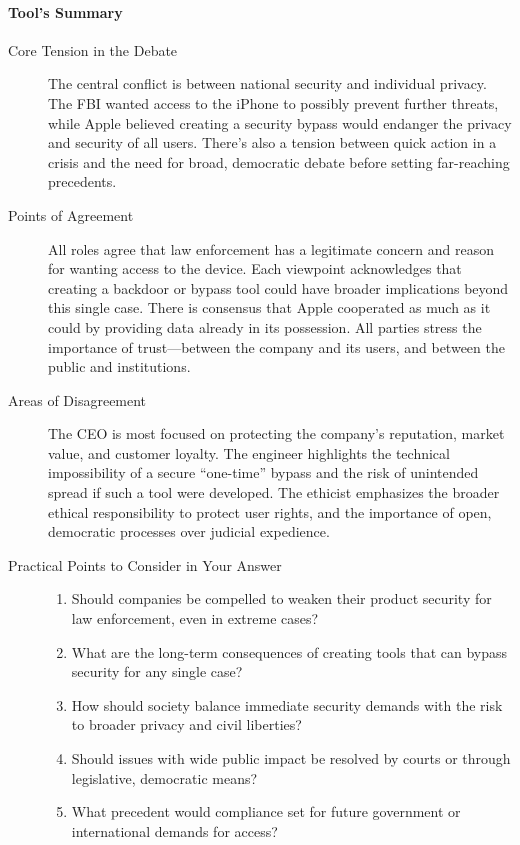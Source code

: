 \paragraph{Tool's Summary}{
  \begin{description}
    \item[Core Tension in the Debate] The central conflict is between national security and individual privacy. The FBI wanted access to the iPhone to possibly prevent further threats, while Apple believed creating a security bypass would endanger the privacy and security of all users. There's also a tension between quick action in a crisis and the need for broad, democratic debate before setting far-reaching precedents.
    \item[Points of Agreement] All roles agree that law enforcement has a legitimate concern and reason for wanting access to the device.
      Each viewpoint acknowledges that creating a backdoor or bypass tool could have broader implications beyond this single case.
      There is consensus that Apple cooperated as much as it could by providing data already in its possession.
      All parties stress the importance of trust—between the company and its users, and between the public and institutions.
    \item[Areas of Disagreement] The CEO is most focused on protecting the company's reputation, market value, and customer loyalty.
      The engineer highlights the technical impossibility of a secure “one-time” bypass and the risk of unintended spread if such a tool were developed.
      The ethicist emphasizes the broader ethical responsibility to protect user rights, and the importance of open, democratic processes over judicial expedience.
    \item[Practical Points to Consider in Your Answer]{
        \hfill
        \begin{enumerate}[label=(\alph*)]
          \item Should companies be compelled to weaken their product security for law enforcement, even in extreme cases?
          \item What are the long-term consequences of creating tools that can bypass security for any single case?
          \item How should society balance immediate security demands with the risk to broader privacy and civil liberties?
          \item Should issues with wide public impact be resolved by courts or through legislative, democratic means?
          \item What precedent would compliance set for future government or international demands for access?
        \end{enumerate}
      }
  \end{description}
}

